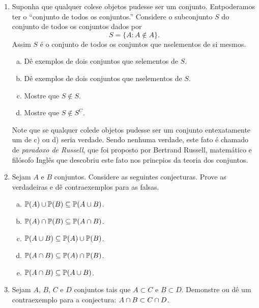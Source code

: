 \begin{enumerate}[{\bf 1.}]
\item Suponha que qualquer cole\cao se objetos pudesse ser um conjunto. Ent\ao poder\ih amos ter o ``conjunto de todos os conjuntos.'' Considere o subconjunto $S$ do conjunto de todos os conjuntos dados por
\[
S=\{A:A\notin A\}.
\]
Assim $S$ \'e o conjunto de todos os conjuntos que n\ao s\ao elementos de si mesmos.
\begin{enumerate}[a)]
\item D\^e exemplos de dois conjuntos que s\ao elementos de $S$.
\item D\^e exemplos de dois conjuntos que n\ao s\ao elementos de $S$.
\item Mostre que $S\notin S$.
\item Mostre que $S\notin S^C$.
\end{enumerate}

\noindent Note que se qualquer cole\cao de objetos pudesse ser um conjunto ent\ao exatamente um de c) ou d) seria verdade. Sendo nenhuma verdade, este fato \'e chamado de {\it paradoxo de Russell}, que foi proposto por Bertrand Russell, matem\'atico e fil\'osofo Ingl\^es que descobriu este fato nos princ\ih pios da teoria dos conjuntos.

\item Sejam $A$ e $B$ conjuntos. Considere as seguintes conjecturas. Prove as verdadeiras e d\^e contraexemplos para as falsas.
\begin{enumerate}[a)]
\item $\mathbb{P}(A)\cup\mathbb{P}(B)\subseteq\mathbb{P}(A\cup B)$.
\item $\mathbb{P}(A)\cap\mathbb{P}(B)\subseteq\mathbb{P}(A\cap B)$.
\item $\mathbb{P}(A\cup B)\subseteq \mathbb{P}(A)\cup\mathbb{P}(B)$.
\item $\mathbb{P}(A\cap B)\subseteq \mathbb{P}(A)\cap\mathbb{P}(B)$.
\item $\mathbb{P}(A\cap B)\subseteq\mathbb{P}(A\cup B)$.
\end{enumerate}

\item Sejam $A$, $B$, $C$ e $D$ conjuntos tais que $A\subset C$ e $B\subset D$. Demonstre ou d\^e um contraexemplo para a conjectura: $A\cap B\subset C\cap D$.


\end{enumerate}
